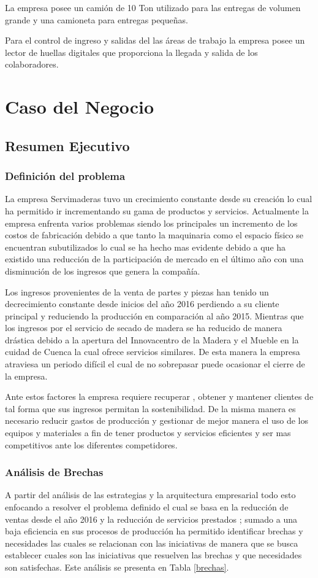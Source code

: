\documentclass[12pt, a4paper]{article}
\begin{document}
La empresa posee un camión de 10 Ton utilizado para las entregas de volumen grande y una camioneta para entregas pequeñas. 

Para el control de ingreso y salidas del las áreas de trabajo la empresa posee un lector de huellas digitales que proporciona la llegada y salida de los colaboradores.


\newpage
\section{Caso del Negocio}
\subsection{Resumen Ejecutivo}
\subsubsection{Definición del problema}

La empresa Servimaderas tuvo un crecimiento constante desde su creación lo cual ha permitido  ir incrementando su gama de productos y servicios. Actualmente la empresa enfrenta varios problemas siendo los principales un incremento de los costos de fabricación debido a que tanto la maquinaria como el espacio físico se encuentran subutilizados lo cual se ha hecho mas evidente debido a que ha existido una reducción de la participación de mercado en el último año con una disminución de los ingresos que genera la compañía. 

Los ingresos provenientes de la venta de partes y piezas han tenido un decrecimiento constante desde inicios del año 2016 perdiendo a su cliente principal y reduciendo la producción en comparación al año 2015. Mientras que los ingresos por el servicio de secado de madera se ha reducido de manera drástica debido a la apertura del Innovacentro de la Madera y el Mueble en la cuidad de Cuenca la cual ofrece servicios similares. De esta manera la empresa atraviesa un periodo difícil el cual de no sobrepasar puede ocasionar el cierre de la empresa. 

Ante estos factores la empresa requiere recuperar , obtener y mantener clientes de tal forma que sus ingresos permitan la sostenibilidad. De la misma manera es necesario reducir gastos de producción y gestionar de mejor manera el uso de los equipos y materiales a fin de tener productos y servicios eficientes y ser mas competitivos ante los diferentes competidores.

\subsubsection{Análisis de Brechas}
A partir del análisis de las estrategias y la arquitectura empresarial todo esto enfocando  a resolver el problema definido el cual se basa en la reducción de ventas desde el año 2016 y la reducción de servicios prestados ; sumado a una baja eficiencia en sus procesos de producción  ha permitido  identificar  brechas y necesidades las cuales se relacionan con las iniciativas de manera que se busca establecer cuales son las iniciativas que  resuelven las brechas y que necesidades son satisfechas. Este análisis se presenta en  Tabla \ref{brechas}. 
\end{document}
